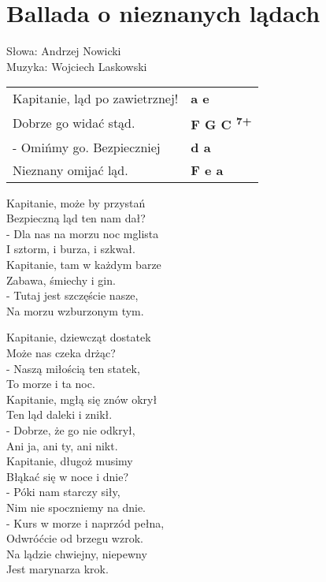 \section{Ballada o nieznanych lądach}

Słowa: Andrzej Nowicki\\
Muzyka: Wojciech Laskowski

\vspace{2em}
\begin{tabular}{@{}p{7cm}@{}l@{}}
Kapitanie, ląd po zawietrznej! & \bfseries a e\\
Dobrze go widać stąd. & \bfseries F G C \textsuperscript{7+} \\
- Omińmy go. Bezpieczniej & \bfseries d a\\
Nieznany omijać ląd. & \bfseries F e a\\
\end{tabular}

\vspace{1em}
Kapitanie, może by przystań \\
Bezpieczną ląd ten nam dał? \\
- Dla nas na morzu noc mglista \\
I sztorm, i burza, i szkwał. \\

Kapitanie, tam w każdym barze \\
Zabawa, śmiechy i gin. \\
- Tutaj jest szczęście nasze, \\
Na morzu wzburzonym tym. \\

\begin{multicols}{2}
Kapitanie, dziewcząt dostatek \\
Może nas czeka drżąc? \\
- Naszą miłością ten statek, \\
To morze i ta noc. \\

Kapitanie, mgłą się znów okrył \\
Ten ląd daleki i znikł. \\
- Dobrze, że go nie odkrył, \\
Ani ja, ani ty, ani nikt. \\

Kapitanie, długoż musimy \\
Błąkać się w noce i dnie? \\
- Póki nam starczy siły, \\
Nim nie spoczniemy na dnie. \\

- Kurs w morze i naprzód pełna, \\
Odwróćcie od brzegu wzrok. \\
Na lądzie chwiejny, niepewny \\
Jest marynarza krok.
\end{multicols}